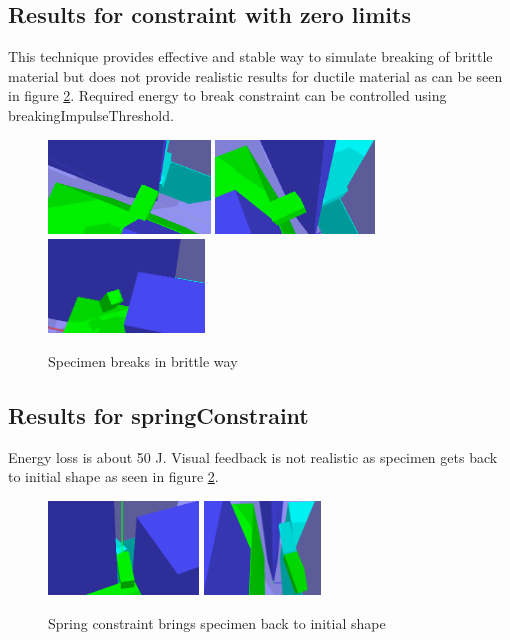 \subsection{Results for constraint with zero limits}
This technique provides effective and stable way to simulate breaking of brittle material 
but does not provide realistic results for ductile material as can be seen in figure \ref{fig:f3-results}.
Required energy to break constraint can be controlled using
breakingImpulseThreshold. 

\begin{figure}[htb!]
\centering
\includegraphics[height=2.5cm]{figs/f3-18-01-1}
\includegraphics[height=2.5cm]{figs/f3-18-01-2}
\includegraphics[height=2.5cm]{figs/f3-18-01-3}
\caption{Specimen breaks in brittle way}
\label{fig:f3-results}
\end{figure}


\subsection{Results for springConstraint}
Energy loss is about 50 J.
Visual feedback is not realistic as specimen gets back to initial shape as seen in figure \ref{fig:f3-results}.

\begin{figure}[htb!]
\centering
\includegraphics[height=2.5cm]{figs/f2-18-01-1}
\includegraphics[height=2.5cm]{figs/f2-18-01-2}
\caption{Spring constraint brings specimen back to initial shape}
\label{fig:f3-results}
\end{figure}

